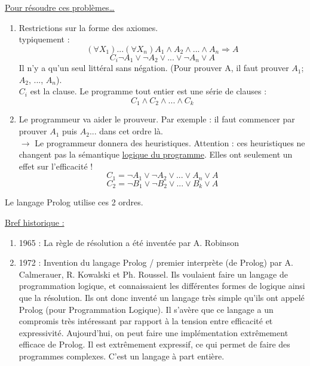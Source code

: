 \underline{Pour résoudre ces problèmes…}
\begin{enumerate}
	\item Restrictions sur la forme des axiomes.\\
	typiquement : 
	\begin{equation}
		(\forall X_{1}) ... (\forall X_{n}) A_{1} \wedge A_{2} \wedge ... \wedge A_{n} \Rightarrow A
	\end{equation}
	\begin{equation}
		C_{i} \neg A_{1} \vee \neg A_{2} \vee ... \vee \neg A_{n} \vee A
	\end{equation}
	Il n’y a qu’un seul littéral sans négation. (Pour prouver A, il faut prouver $A_{1}$; $A_{2}$, ..., $A_{n}$).\\
	$C_{i}$ est la clause. Le programme tout entier est une série de clauses :
	\begin{equation}
		C_{1} \wedge C_{2} \wedge ... \wedge C_{k}
	\end{equation}
	\item Le programmeur va aider le prouveur.
	Par exemple : il faut commencer par prouver $A_{1}$ puis $A_{2}$... dans cet ordre là.\\
	$\rightarrow$ Le programmeur donnera des heuristiques. Attention : ces heuristiques ne changent pas la sémantique \underline{logique du programme}. Elles ont seulement un effet sur l’efficacité !
	\begin{equation}
		C_{1} = \neg A_{1} \vee \neg A_{2} \vee ... \vee A_{n} \vee A
	\end{equation}
	\begin{equation}
		C_{2} = \neg B_{1} \vee \neg B_{2} \vee ... \vee B_{k} \vee A
	\end{equation}
\end{enumerate}

Le langage Prolog utilise ces 2 ordres.

\underline{Bref historique :}
\begin{enumerate}
	\item 1965 : 	La règle de résolution a été inventée par A. Robinson
	\item 1972 :	Invention du langage Prolog / premier interprète (de Prolog) par A. Calmerauer, R. Kowalski et Ph. Roussel. 
Ils voulaient faire un langage de programmation logique, et connaissaient les différentes formes de logique ainsi que la résolution. Ils ont donc inventé un langage très simple qu'ils ont appelé Prolog (pour Programmation Logique).  Il s'avère que ce langage a un compromis très intéressant par rapport à la tension entre efficacité et expressivité.
Aujourd'hui, on peut faire une implémentation extrêmement efficace de Prolog. Il est extrêmement expressif, ce qui permet de faire des programmes complexes. C’est un langage à part entière.
\end{enumerate}

